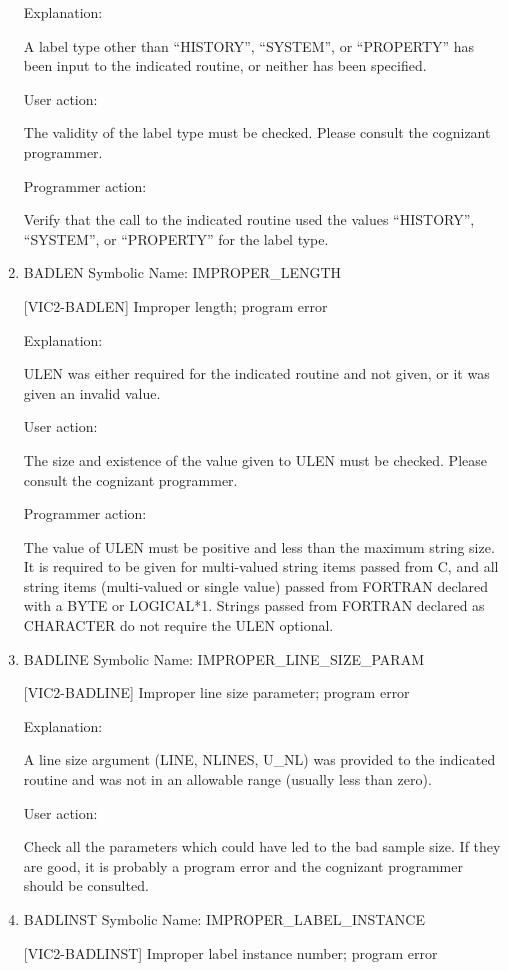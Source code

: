 \begin{enumerate}
Explanation:

A label type other than ``HISTORY'', ``SYSTEM'', or ``PROPERTY'' has
been input to the indicated routine, or neither has been specified.

User action:

The validity of the label type must be checked.  Please consult
the cognizant programmer.

Programmer action:

Verify that the call to the indicated routine used the values
``HISTORY'', ``SYSTEM'', or ``PROPERTY'' for the label type.


\item BADLEN Symbolic Name: IMPROPER\_LENGTH

[VIC2-BADLEN] Improper length; program error

Explanation:

ULEN was either required for the indicated routine and not
given, or it was given an invalid value.

User action:

The size and existence of the value given to ULEN must be
checked. Please consult the cognizant programmer.

Programmer action:

The value of ULEN must be positive and less than the maximum
string size.  It is required to be given for multi-valued string
items passed from C, and all string items (multi-valued or single
value) passed from FORTRAN declared with a BYTE or LOGICAL*1.
Strings passed from FORTRAN declared as CHARACTER do not require
the ULEN optional.


\item BADLINE Symbolic Name: IMPROPER\_LINE\_SIZE\_PARAM

[VIC2-BADLINE] Improper line size parameter; program error

Explanation:

A line size argument (LINE, NLINES, U\_NL) was provided to the
indicated routine and was not in an allowable range (usually less
than zero).

User action:

Check all the parameters which could have led to the bad sample size.
If they are good, it is probably a program error and the cognizant
programmer should be consulted.


\item BADLINST Symbolic Name: IMPROPER\_LABEL\_INSTANCE

[VIC2-BADLINST] Improper label instance number; program error


\end{enumerate}
